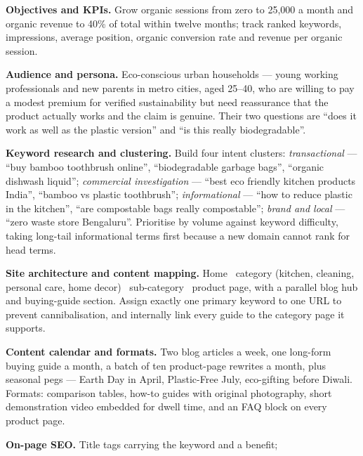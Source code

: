 \begin{qlist}
\begin{apts}
\item \textbf{Objectives and KPIs.} Grow organic sessions from zero to 25{,}000
      a month and organic revenue to 40\% of total within twelve months; track
      ranked keywords, impressions, average position, organic conversion rate
      and revenue per organic session.
\item \textbf{Audience and persona.} Eco-conscious urban households --- young
      working professionals and new parents in metro cities, aged 25--40, who
      are willing to pay a modest premium for verified sustainability but need
      reassurance that the product actually works and the claim is genuine.
      Their two questions are ``does it work as well as the plastic version''
      and ``is this really biodegradable''.
\item \textbf{Keyword research and clustering.} Build four intent clusters:
      \emph{transactional} --- ``buy bamboo toothbrush online'', ``biodegradable
      garbage bags'', ``organic dishwash liquid''; \emph{commercial
      investigation} --- ``best eco friendly kitchen products India'', ``bamboo
      vs plastic toothbrush''; \emph{informational} --- ``how to reduce plastic
      in the kitchen'', ``are compostable bags really compostable'';
      \emph{brand and local} --- ``zero waste store Bengaluru''. Prioritise by
      volume against keyword difficulty, taking long-tail informational terms
      first because a new domain cannot rank for head terms.
\item \textbf{Site architecture and content mapping.} Home \ra\ category
      (kitchen, cleaning, personal care, home decor) \ra\ sub-category \ra\
      product page, with a parallel blog hub and buying-guide section. Assign
      exactly one primary keyword to one URL to prevent cannibalisation, and
      internally link every guide to the category page it supports.
\item \textbf{Content calendar and formats.} Two blog articles a week, one
      long-form buying guide a month, a batch of ten product-page rewrites a
      month, plus seasonal pegs --- Earth Day in April, Plastic-Free July,
      eco-gifting before Diwali. Formats: comparison tables, how-to guides with
      original photography, short demonstration video embedded for dwell time,
      and an FAQ block on every product page.
\item \textbf{On-page SEO.} Title tags carrying the keyword and a benefit;

\end{apts}
\end{qlist}
